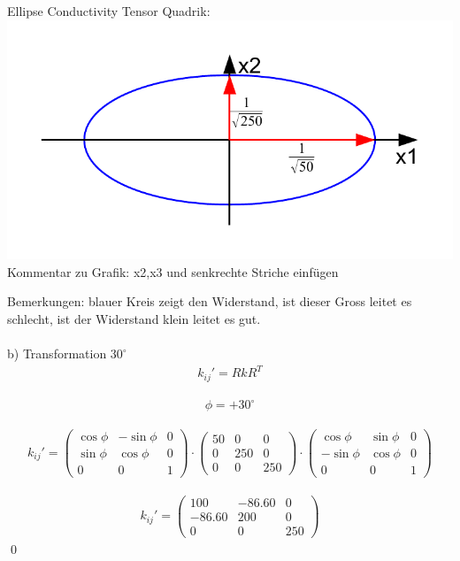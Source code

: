 \begin{center}
	Ellipse Conductivity Tensor Quadrik:\\
	\includegraphics[scale=0.8]{images/quadrik_2d_ellipse_uebung.pdf}\\
	Kommentar zu Grafik: x2,x3 und senkrechte Striche einfügen\\
\end{center}
Bemerkungen: blauer Kreis zeigt den Widerstand, ist dieser Gross leitet es schlecht, ist der Widerstand klein leitet es gut.
\\
\\
b) Transformation $30^\circ$
\begin{align}
k_{ij}'=RkR^{T}
\end{align}

\begin{align}
\phi=+30^\circ
\end{align}

\begin{align}
k_{ij}'=\begin{pmatrix}
\cos{\phi} & -\sin{\phi} & 0 \\
\sin{\phi} & \cos{\phi} & 0 \\
0 & 0 & 1
\end{pmatrix}
\cdot
\begin{pmatrix}
50 & 0 & 0 \\
0 & 250 & 0 \\
0 & 0 & 250 
\end{pmatrix}
\cdot
\begin{pmatrix}
\cos{\phi} & \sin{\phi} & 0 \\
-\sin{\phi} & \cos{\phi} & 0 \\
0 & 0 & 1
\end{pmatrix}
\end{align}

\begin{align}
k_{ij}'=\begin{pmatrix}
100 & -86.60 & 0 \\
-86.60 & 200 & 0 \\
0 & 0 & 250
\end{pmatrix}
\end{align}
\qed

